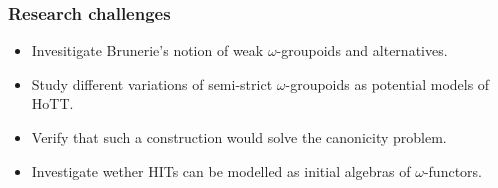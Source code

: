 \documentclass[twocolumn,a4paper,11pt]{article}
\begin{document}
\subsubsection*{Research challenges}
\label{sec:rsearch-challenges}
\begin{itemize}
\item Invesitigate Brunerie's notion of weak $\omega$-groupoids and alternatives.
\item Study different variations of semi-strict $\omega$-groupoids as
  potential models of HoTT.
\item Verify that such a construction would solve the canonicity problem.
\item Investigate wether HITs can be modelled as initial algebras of
  $\omega$-functors. 
\end{itemize}




\end{document}
